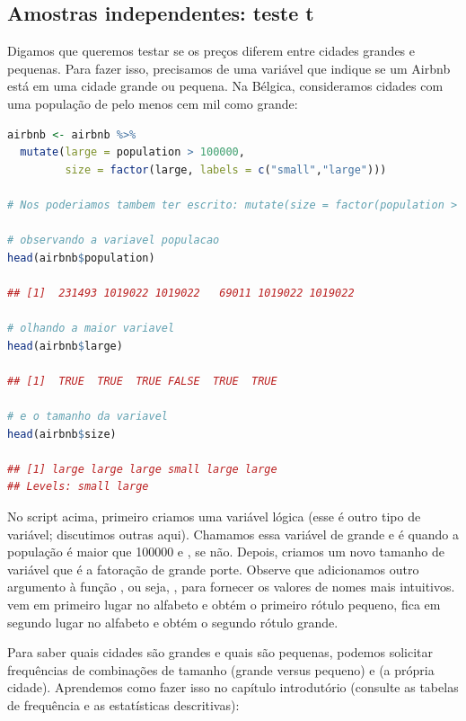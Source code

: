 \documentclass{article}
\begin{document}
\subsection{Amostras independentes: teste t}

Digamos que queremos testar se os preços diferem entre cidades grandes e pequenas. Para fazer isso, precisamos de uma variável que indique se um Airbnb está em uma cidade grande ou pequena. Na Bélgica, consideramos cidades com uma população de pelo menos cem mil como grande:

\begin{lstlisting}[language=R]
airbnb <- airbnb %>% 
  mutate(large = population > 100000,
         size = factor(large, labels = c("small","large")))

# Nos poderiamos tambem ter escrito: mutate(size = factor(population > 100000, labels = c("small","large)))

# observando a variavel populacao
head(airbnb$population)

## [1]  231493 1019022 1019022   69011 1019022 1019022

# olhando a maior variavel
head(airbnb$large)

## [1]  TRUE  TRUE  TRUE FALSE  TRUE  TRUE

# e o tamanho da variavel
head(airbnb$size)

## [1] large large large small large large
## Levels: small large
\end{lstlisting}

No script acima, primeiro criamos uma variável lógica (esse é outro tipo de variável; discutimos outras aqui). Chamamos essa variável de grande e é  quando a população é maior que 100000 e , se não. Depois, criamos um novo tamanho de variável que é a fatoração de grande porte. Observe que adicionamos outro argumento à função , ou seja, , para fornecer os valores  de nomes mais intuitivos.  vem em primeiro lugar no alfabeto e obtém o primeiro rótulo pequeno,  fica em segundo lugar no alfabeto e obtém o segundo rótulo grande.

Para saber quais cidades são grandes e quais são pequenas, podemos solicitar frequências de combinações de tamanho (grande versus pequeno) e  (a própria cidade). Aprendemos como fazer isso no capítulo introdutório (consulte as tabelas de frequência e as estatísticas descritivas):
\end{document}
